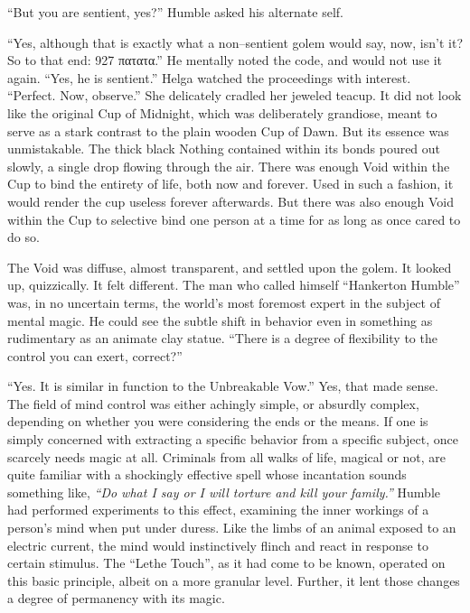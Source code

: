 “But you are sentient, yes?” Humble asked his alternate self.

“Yes, although that is exactly what a non\mbox{--}sentient golem would say, now, isn’t it? So to that end: 927 πατατα.”
\SmallVSpace
He mentally noted the code, and would not use it again. “Yes, he is sentient.”
\SmallVSpace
Helga watched the proceedings with interest. “Perfect. Now, observe.” She delicately cradled her jeweled teacup. It did not look like the original Cup of Midnight, which was deliberately grandiose, meant to serve as a stark contrast to the plain wooden Cup of Dawn. But its essence was unmistakable. The thick black Nothing contained within its bonds poured out slowly, a single drop flowing through the air.
\SmallVSpace
There was enough Void within the Cup to bind the entirety of life, both now and forever. Used in such a fashion, it would render the cup useless forever afterwards. But there was also enough Void within the Cup to selective bind one person at a time for as long as once cared to do so.

The Void was diffuse, almost transparent, and settled upon the golem. It looked up, quizzically. It felt different.
\SmallVSpace
The man who called himself “Hankerton Humble” was, in no uncertain terms, the world’s most foremost expert in the subject of mental magic. He could see the subtle shift in behavior even in something as rudimentary as an animate clay statue. “There is{\el} a degree of flexibility to the control you can exert, correct?”

“Yes. It is similar in function to the Unbreakable Vow.”
\SmallVSpace
Yes, that made sense. The field of mind control was either achingly simple, or absurdly complex, depending on whether you were considering the ends or the means. If one is simply concerned with extracting a specific behavior from a specific subject, once scarcely needs magic at all. Criminals from all walks of life, magical or not, are quite familiar with a shockingly effective spell whose incantation sounds something like, \emph{“Do what I say or I will torture and kill your family.”}
\SmallVSpace
Humble had performed experiments to this effect, examining the inner workings of a person’s mind when put under duress. Like the limbs of an animal exposed to an electric current, the mind would instinctively flinch and react in response to certain stimulus. The “Lethe Touch”, as it had come to be known, operated on this basic principle, albeit on a more granular level. Further, it lent those changes a degree of permanency with its magic.

